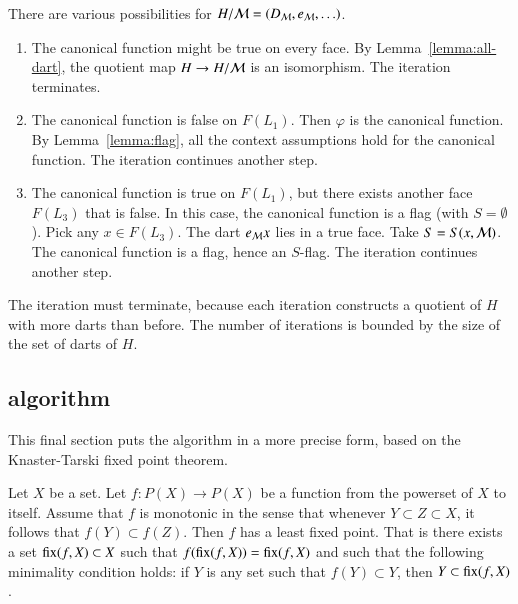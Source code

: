 There are various possibilities for $H/{\cal M} = (D_{\cal M},e_{\cal M},\ldots)$.
\begin{enumerate}
\item  The canonical function might be true on every face.  By Lemma~\ref{lemma:all-dart}, the quotient map $H\to H/{\cal M}$ is an isomorphism.  The iteration terminates.
\item The canonical function is false on $F(L_1)$.  Then $\varphi$ is the canonical function.  By Lemma~\ref{lemma:flag}, all the context assumptions hold for the canonical function.  The iteration continues another step.
\item The canonical function is true on $F(L_1)$, but there exists another face $F(L_3)$ that is false.  In this case, the canonical function is a flag (with $S=\emptyset$).  Pick any $x\in F(L_3)$.  The dart $e_{\cal M} x$ lies in a true face.  Take $S=S(x,{\cal M})$.  The canonical function is a flag, hence an $S$-flag.  The iteration continues another step.
\end{enumerate}

The iteration must terminate, because each iteration constructs a quotient of $H$ with more darts than before.  The number of iterations is bounded by the size of the set of darts of $H$.

\subsection{algorithm}

This final section puts the algorithm in a more precise form, based on the Knaster-Tarski fixed point theorem.

\begin{lemma}   Let $X$ be a set.  Let $f:P(X)\to P(X)$ be a function from the powerset of $X$ to itself.  Assume that $f$ is monotonic in the sense that whenever $Y\subset Z\subset X$, it follows that
$f(Y) \subset f(Z)$.  Then $f$ has a least fixed point.  That is there exists a set ${\operatorname{fix}}(f,X)\subset X$ such that $f({\operatorname{fix}}(f,X)) = {\operatorname{fix}}(f,X)$ and such that the following minimality condition holds: if $Y$ is any set such that $f(Y) \subset Y$, then $Y\subset {\operatorname{fix}}(f,X)$.
\end{lemma}

